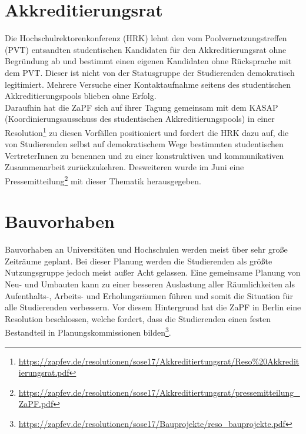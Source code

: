\documentclass[a4paper]{article}
\begin{document}
\section*{Akkreditierungsrat}
Die Hochschulrektorenkonferenz (HRK) lehnt den vom Poolvernetzungstreffen (PVT)
entsandten studentischen Kandidaten für den Akkreditierungsrat ohne Begründung
ab und bestimmt einen eigenen Kandidaten ohne Rücksprache mit dem PVT. Dieser
ist nicht von der Statusgruppe der Studierenden demokratisch legitimiert.
Mehrere Versuche einer Kontaktaufnahme seitens des studentischen
Akkreditierungspools blieben ohne Erfolg.\\ Daraufhin hat die ZaPF sich auf
ihrer Tagung gemeinsam mit dem KASAP (Koordinierungsausschuss des studentischen
Akkreditierungspools) in einer
Resolution\footnote{\href{https://zapfev.de/resolutionen/sose17/Akkreditiertungsrat/Reso\%20Akkreditierungsrat.pdf}
{\url{https://zapfev.de/resolutionen/sose17/Akkreditiertungsrat/Reso\%20Akkreditierungsrat.pdf}}}
zu diesen Vorfällen positioniert und fordert die HRK dazu auf, die von
Studierenden selbst auf demokratischem Wege bestimmten studentischen
VertreterInnen zu benennen und zu einer konstruktiven und kommunikativen
Zusammenarbeit zurückzukehren. Desweiteren wurde im Juni eine
Pressemitteilung\footnote{\href{https://zapfev.de/resolutionen/sose17/Akkreditiertungsrat/pressemitteilung_ZaPF.pdf}
{\url{https://zapfev.de/resolutionen/sose17/Akkreditiertungsrat/pressemitteilung\_ZaPF.pdf}}}
mit dieser Thematik herausgegeben. 

\section*{Bauvorhaben}
Bauvorhaben an Universitäten und Hochschulen werden meist über sehr große
Zeiträume geplant. Bei dieser Planung werden die Studierenden als größte
Nutzungsgruppe jedoch meist außer Acht gelassen.  Eine gemeinsame Planung von
Neu- und Umbauten kann zu einer besseren Auslastung aller Räumlichkeiten als
Aufenthalts-, Arbeits- und Erholungsräumen führen und somit die Situation für
alle Studierenden verbessern. Vor diesem Hintergrund hat die ZaPF in Berlin
eine Resolution beschlossen, welche fordert, dass die Studierenden einen festen
Bestandteil in Planungskommissionen
bilden\footnote{\href{https://zapfev.de/resolutionen/sose17/Bauprojekte/reso_bauprojekte.pdf}{\url{https://zapfev.de/resolutionen/sose17/Bauprojekte/reso_bauprojekte.pdf}}}.
\end{document}
